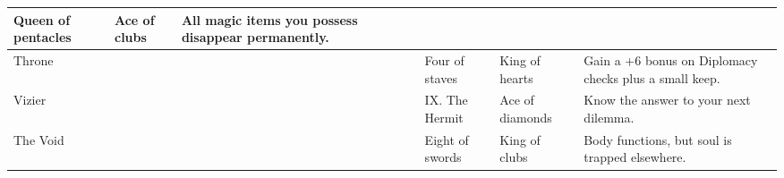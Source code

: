 \begin{longtable}{llllllll}
{\begin{minipage}[t]{0.460in}
Queen of pentacles\end{minipage}} & \multicolumn{1}{p{0.872in}|}{\begin{minipage}[t]{0.872in}\raggedright
Ace of clubs\end{minipage}} & \multicolumn{1}{p{1.000in}|}{\begin{minipage}[t]{1.000in}\raggedright
All magic items you possess disappear permanently.\end{minipage}}\\
\hline
\multicolumn{5}{p{2.168in}|}{\begin{minipage}[t]{2.168in}\raggedright
Throne\end{minipage}} & \multicolumn{1}{|p{0.460in}|}{\begin{minipage}[t]{0.460in}\raggedright
Four of staves\end{minipage}} & \multicolumn{1}{p{0.872in}|}{\begin{minipage}[t]{0.872in}\raggedright
King of hearts\end{minipage}} & \multicolumn{1}{p{1.000in}|}{\begin{minipage}[t]{1.000in}\raggedright
Gain a +6 bonus on Diplomacy checks plus a small keep.\end{minipage}}\\
\hline
\multicolumn{5}{p{2.168in}|}{\begin{minipage}[t]{2.168in}\raggedright
Vizier\end{minipage}} & \multicolumn{1}{|p{0.460in}|}{\begin{minipage}[t]{0.460in}\raggedright
IX. The Hermit\end{minipage}} & \multicolumn{1}{p{0.872in}|}{\begin{minipage}[t]{0.872in}\raggedright
Ace of diamonds\end{minipage}} & \multicolumn{1}{p{1.000in}|}{\begin{minipage}[t]{1.000in}\raggedright
Know the answer to your next dilemma.\end{minipage}}\\
\hline
\multicolumn{5}{p{2.168in}|}{\begin{minipage}[t]{2.168in}\raggedright
The Void\end{minipage}} & \multicolumn{1}{|p{0.460in}|}{\begin{minipage}[t]{0.460in}\raggedright
Eight of swords\end{minipage}} & \multicolumn{1}{p{0.872in}|}{\begin{minipage}[t]{0.872in}\raggedright
King of clubs\end{minipage}} & \multicolumn{1}{p{1.000in}|}{\begin{minipage}[t]{1.000in}\raggedright
Body functions, but soul is trapped elsewhere.\end{minipage}}\\
\hline
\end{longtable}

